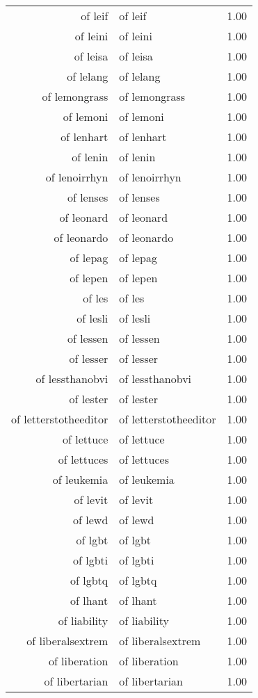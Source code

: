 \begin{table}[ht]
\begin{tabular}{rlr}
  of leif & of leif & 1.00 \\ 
  of leini & of leini & 1.00 \\ 
  of leisa & of leisa & 1.00 \\ 
  of lelang & of lelang & 1.00 \\ 
  of lemongrass & of lemongrass & 1.00 \\ 
  of lemoni & of lemoni & 1.00 \\ 
  of lenhart & of lenhart & 1.00 \\ 
  of lenin & of lenin & 1.00 \\ 
  of lenoirrhyn & of lenoirrhyn & 1.00 \\ 
  of lenses & of lenses & 1.00 \\ 
  of leonard & of leonard & 1.00 \\ 
  of leonardo & of leonardo & 1.00 \\ 
  of lepag & of lepag & 1.00 \\ 
  of lepen & of lepen & 1.00 \\ 
  of les & of les & 1.00 \\ 
  of lesli & of lesli & 1.00 \\ 
  of lessen & of lessen & 1.00 \\ 
  of lesser & of lesser & 1.00 \\ 
  of lessthanobvi & of lessthanobvi & 1.00 \\ 
  of lester & of lester & 1.00 \\ 
  of letterstotheeditor & of letterstotheeditor & 1.00 \\ 
  of lettuce & of lettuce & 1.00 \\ 
  of lettuces & of lettuces & 1.00 \\ 
  of leukemia & of leukemia & 1.00 \\ 
  of levit & of levit & 1.00 \\ 
  of lewd & of lewd & 1.00 \\ 
  of lgbt & of lgbt & 1.00 \\ 
  of lgbti & of lgbti & 1.00 \\ 
  of lgbtq & of lgbtq & 1.00 \\ 
  of lhant & of lhant & 1.00 \\ 
  of liability & of liability & 1.00 \\ 
  of liberalsextrem & of liberalsextrem & 1.00 \\ 
  of liberation & of liberation & 1.00 \\ 
  of libertarian & of libertarian & 1.00 \\ 

\end{tabular}
\end{table}
